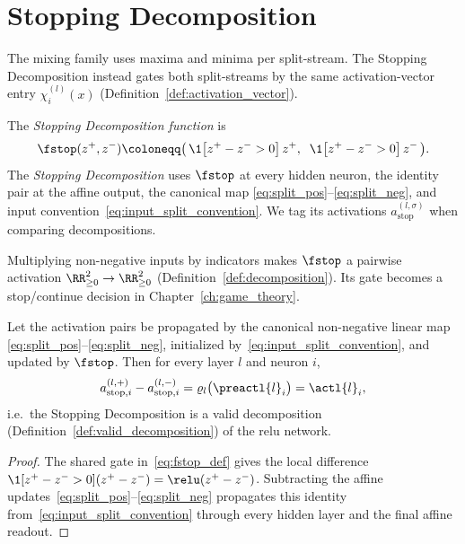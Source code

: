 \section{Stopping Decomposition}\label{sec:stopping_decomposition}

The mixing family uses maxima and minima per split-stream. The Stopping Decomposition instead gates both split-streams by the same activation-vector entry $\chi_i^{(l)}(x)$ (Definition~\ref{def:activation_vector}).

\begin{definition}\label{def:fstop}
The \emph{Stopping Decomposition function} is
\begin{equation}
	\fstop(z^+, z^-) \coloneqq \bigl(\, \1\bigl[z^+ - z^- > 0\bigr]\, z^+, \;\; \1\bigl[z^+ - z^- > 0\bigr]\, z^- \,\bigr).
	\label{eq:fstop_def}
\end{equation}
The \emph{Stopping Decomposition} uses $\fstop$ at every hidden neuron, the identity pair at the affine output, the canonical map \eqref{eq:split_pos}--\eqref{eq:split_neg}, and input convention~\eqref{eq:input_split_convention}. We tag its activations $a_{\mathrm{stop}}^{(l,\sigma)}$ when comparing decompositions.
\end{definition}

Multiplying non-negative inputs by indicators makes $\fstop$ a pairwise activation $\RR^2_{\ge 0}\to\RR^2_{\ge 0}$ (Definition~\ref{def:decomposition}). Its gate becomes a stop/continue decision in Chapter~\ref{ch:game_theory}.

\begin{theoremenv}\label{thm:stopping_validity}
Let the activation pairs be propagated by the canonical non-negative linear map \eqref{eq:split_pos}--\eqref{eq:split_neg}, initialized by~\eqref{eq:input_split_convention}, and updated by $\fstop$. Then for every layer $l$ and neuron $i$,
\begin{equation}
	a_{\mathrm{stop},i}^{(l,+)} - a_{\mathrm{stop},i}^{(l,-)} = \varrho_l\bigl(\preactl{l}_i\bigr) = \actl{l}_i,
	\label{eq:stopping_recovery}
\end{equation}
i.e.\ the Stopping Decomposition is a valid decomposition (Definition~\ref{def:valid_decomposition}) of the \ac{relu} network.\end{theoremenv}

\begin{proof}
The shared gate in~\eqref{eq:fstop_def} gives the local difference $\1[z^+-z^->0](z^+-z^-)=\relu(z^+-z^-)$. Subtracting the affine updates~\eqref{eq:split_pos}--\eqref{eq:split_neg} propagates this identity from~\eqref{eq:input_split_convention} through every hidden layer and the final affine readout.
\end{proof}

